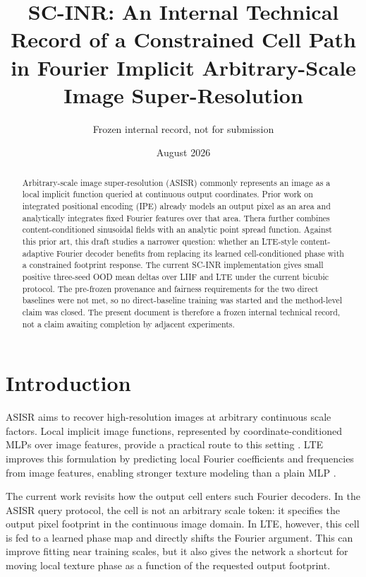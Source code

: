 \documentclass[10pt]{article}
\title{SC-INR: An Internal Technical Record of a Constrained Cell Path in Fourier Implicit Arbitrary-Scale Image Super-Resolution}
\author{Frozen internal record, not for submission}
\date{August 2026}
\begin{document}
\maketitle

\noindent{}
\vspace{0.8em}

\begin{abstract}
Arbitrary-scale image super-resolution (ASISR) commonly represents an image as
a local implicit function queried at continuous output coordinates. Prior work
on integrated positional encoding (IPE) already models an output pixel as an
area and analytically integrates fixed Fourier features over that area. Thera
further combines content-conditioned sinusoidal fields with an analytic point
spread function. Against this prior art, this draft studies a narrower question:
whether an LTE-style content-adaptive Fourier decoder benefits from replacing
its learned cell-conditioned phase with a constrained footprint response. The
current SC-INR implementation gives small positive three-seed OOD mean deltas
over LIIF and LTE under the current bicubic protocol. The pre-frozen provenance
and fairness requirements for the two direct baselines were not met, so no
direct-baseline training was started and the method-level claim was closed. The
present document is therefore a frozen internal technical record, not a claim
awaiting completion by adjacent experiments.
\end{abstract}

\section{Introduction}

ASISR aims to recover high-resolution images at arbitrary continuous scale
factors. Local implicit image functions, represented by coordinate-conditioned
MLPs over image features, provide a practical route to this setting
\citep{chen2021liif}. LTE improves this formulation by predicting local Fourier
coefficients and frequencies from image features, enabling stronger texture
modeling than a plain MLP \citep{lee2022lte}.

The current work revisits how the output cell enters such Fourier decoders. In
the ASISR query protocol, the cell is not an arbitrary scale token: it specifies
the output pixel footprint in the continuous image domain. In LTE, however, this
cell is fed to a learned phase map and directly shifts the Fourier argument.
This can improve fitting near training scales, but it also gives the network a
shortcut for moving local texture phase as a function of the requested output
footprint.
\end{document}
